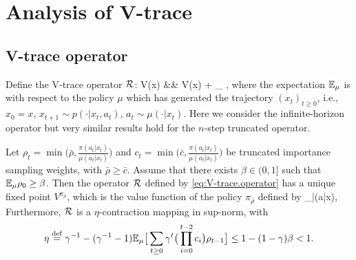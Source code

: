 
\section{Analysis of V-trace}\label{sec:analysis}
\subsection{V-trace operator}
Define the V-trace operator ${\cal R}$:
\beqa\label{eq:V-trace.operator}
\R V(x) &\eqdef& V(x) + \E_{\mu} \Big[\sum_{t\geq 0} \gamma^t \big(c_0\dots c_{t-1}\big) \rho_t\big(r_t+\gamma V(x_{t+1})-V(x_t)\big) \big|x_0=x, \mu \Big],
\eeqa
where the expectation $\mathbb{E}_{\mu}$ is with respect to the policy $\mu$ which has generated the trajectory $(x_t)_{t\geq 0}$, i.e., $x_0=x$, $x_{t+1}\sim p(\cdot|x_t, a_t)$, $a_t\sim \mu(\cdot|x_t)$.
Here we consider the infinite-horizon operator but very similar results hold for the $n$-step truncated operator.

\begin{theorem}\label{thm:V-trace.contraction}
Let $\rho_t = \min\big(\bar \rho, \frac{\pi(a_t|x_t)}{\mu(a_t|x_t)}\big)$ and $c_t = \min\big(\bar c, \frac{\pi(a_t|x_t)}{\mu(a_t|x_t)}\big)$ be truncated importance sampling weights, with $\bar \rho\geq \bar c$. Assume that there exists $\beta\in (0,1]$ such that $\mathbb{E}_{\mu}\rho_0\geq \beta$. Then the operator ${\cal R}$ defined by \eqref{eq:V-trace.operator} has a unique fixed point $V^{\pi_{\bar \rho}}$, which is the value function of the policy $\pi_{\bar \rho}$ defined by
 \beq\label{eq:pi_rho.apx}
 \pi_{\bar \rho}(a|x)\eqdef {},
 \eeq
Furthermore, ${\cal R}$ is a $\eta$-contraction mapping in sup-norm, with 
$$\eta \stackrel{\rm def}{=} \gamma^{-1} - (\gamma^{-1}-1) \mathbb{E}_{\mu} \big[ \sum_{t\geq 0} \gamma^{t} \big( \prod_{i=0}^{t-2} c_i\big)\rho_{t-1} \big] \leq 1-(1-\gamma)\beta<1.$$
\end{theorem}

